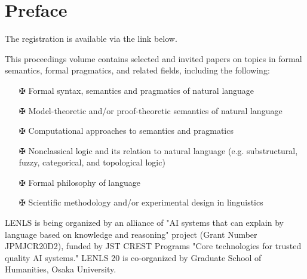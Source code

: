 \documentclass[12pt]{jarticle}
\begin{document}
\newpage
\section*{Preface}
The registration is available via the link below. 

This proceedings volume contains selected and invited papers on topics in formal semantics, formal pragmatics, and related fields, including the following:
\begin{itemize}
\item[$\maltese$] Formal syntax, semantics and pragmatics of natural language
\item[$\maltese$] Model-theoretic and/or proof-theoretic semantics of natural language
\item[$\maltese$] Computational approaches to semantics and pragmatics
\item[$\maltese$] Nonclassical logic and its relation to natural language 
  (e.g. substructural, fuzzy, categorical, and topological logic)
\item[$\maltese$] Formal philosophy of language
\item[$\maltese$] Scientific methodology and/or experimental design in linguistics
\end{itemize}


LENLS is being organized by an alliance of "AI systems that can explain by language based on knowledge and reasoning" project (Grant Number JPMJCR20D2), funded by JST CREST Programs "Core technologies for trusted quality AI systems."  LENLS 20 is co-organized by Graduate School of Humanities, Osaka University.
\end{document}
